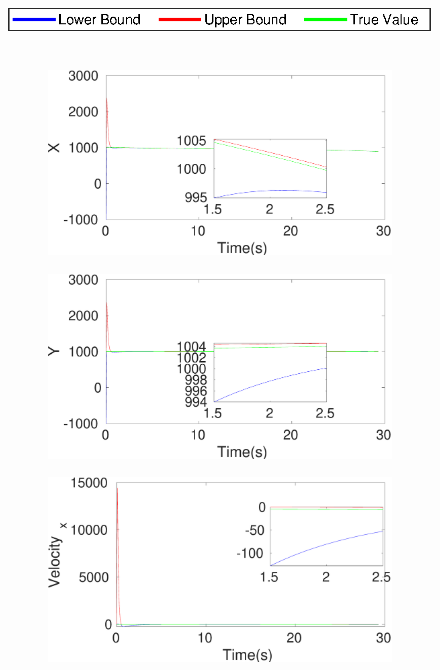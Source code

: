 \begin{figure}[!h]
\hspace*{\fill} \includegraphics[scale=0.8]{figures/legend}\\\\
\begin{subfigure}{.5\linewidth}
\centering
\includegraphics[width=\linewidth]{figures/HInf/s3pmHInfX}
\end{subfigure}
\begin{subfigure}{.5\linewidth}
\centering
\includegraphics[width=\linewidth]{figures/HInf/s3pmHInfY}
\end{subfigure}
\begin{subfigure}{.5\linewidth}
\centering
\includegraphics[width=\linewidth]{figures/HInf/s3pmHInfVelocity_x}

\end{subfigure}
\end{figure}
